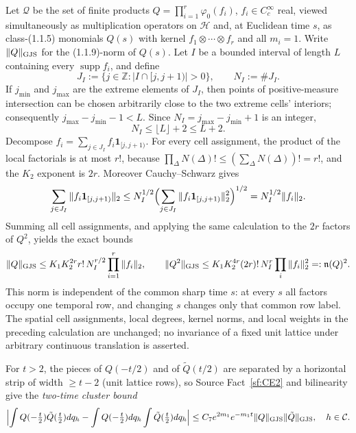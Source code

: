 \documentclass[11pt,a4paper]{article}
\theoremstyle{plain}
\theoremstyle{definition}
\newcommand{\Z}{\mathbb{Z}}
\newcommand{\Q}{\mathcal{Q}}
\newcommand{\HH}{\mathcal{H}}
\DeclareMathOperator{\supp}{supp}
\begin{document}
Let $\Q$ be the set of finite products $Q=\prod_{i=1}^r\varphi_0(f_i)$, $f_i\in C_c^\infty$
real, viewed simultaneously as multiplication operators on $\HH$ and, at Euclidean time $s$, as
class-(1.1.5) monomials $Q(s)$ with kernel $f_1\otimes\cdots\otimes f_r$ and all $m_i=1$. Write
$\|Q\|_{\rm GJS}$ for the (1.1.9)-norm of $Q(s)$. Let $I$ be a bounded interval of length
$L$ containing every $\supp f_i$, and define
\[
 J_I:=\{j\in\Z:|I\cap[j,j+1)|>0\},\qquad N_I:=\#J_I .
\]
If $j_{\min}$ and $j_{\max}$ are the extreme elements of $J_I$, then points of positive-measure
intersection can be chosen arbitrarily close to the two extreme cells' interiors; consequently
$j_{\max}-j_{\min}-1<L$. Since $N_I=j_{\max}-j_{\min}+1$ is an integer,
\[
  N_I\le\lfloor L\rfloor+2\le L+2.
\]
Decompose $f_i=\sum_{j\in J_I}f_i\mathbf1_{[j,j+1)}$. For every cell assignment, the product
of the local factorials is at most $r!$, because
$\prod_\Delta N(\Delta)!\le(\sum_\Delta N(\Delta))!=r!$, and the $K_2$ exponent is $2r$.
Moreover Cauchy--Schwarz gives
\[
 \sum_{j\in J_I}\|f_i\mathbf1_{[j,j+1)}\|_2
 \le N_I^{1/2}\Bigl(\sum_{j\in J_I}
       \|f_i\mathbf1_{[j,j+1)}\|_2^2\Bigr)^{1/2}
 =N_I^{1/2}\|f_i\|_2.
\]
Summing all cell assignments, and applying the same calculation to the $2r$ factors of $Q^2$,
yields the exact bounds
\begin{equation}\label{eq:normbound}
  \|Q\|_{\rm GJS}\le K_1K_2^{2r}r!\,N_I^{r/2}\prod_{i=1}^r\|f_i\|_2,\qquad
  \|Q^2\|_{\rm GJS}\le K_1K_2^{4r}(2r)!\,N_I^r\prod_i\|f_i\|_2^2
  =:\mathfrak n(Q)^2 .
\end{equation}
This norm is independent of the common sharp time $s$: at every $s$ all factors occupy one
temporal row, and changing $s$ changes only that common row label. The spatial cell assignments,
local degrees, kernel norms, and local weights in the preceding calculation are unchanged; no
invariance of a fixed unit lattice under arbitrary continuous translation is asserted.

For $t>2$, the pieces of $Q(-t/2)$ and of $\tilde Q(t/2)$ are separated by a horizontal strip of
width $\ge t-2$ (unit lattice rows), so Source Fact~\ref{sf:CE2} and bilinearity give the
\emph{two-time cluster bound}
\begin{equation}\label{eq:2time}
  \Bigl|\int Q(-\tfrac t2)\tilde Q(\tfrac t2)dq_h-\int Q(-\tfrac t2)dq_h
  \int\tilde Q(\tfrac t2)dq_h\Bigr|
  \le C_7e^{2m_1}e^{-m_1t}\|Q\|_{\rm GJS}\|\tilde Q\|_{\rm GJS},\quad h\in\mathcal C .
\end{equation}
\end{document}
